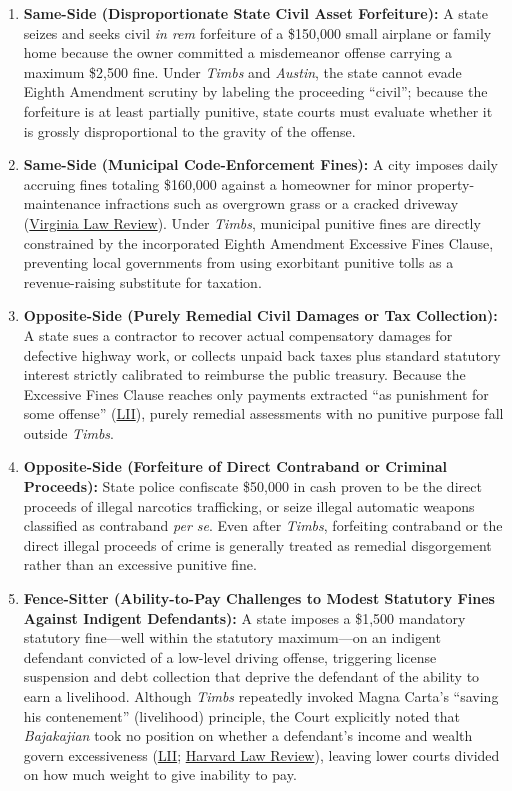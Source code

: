 \documentclass[12pt]{article}
\begin{document}
\begin{enumerate}
  \item \textbf{Same-Side (Disproportionate State Civil Asset Forfeiture):} A state seizes and seeks civil \textit{in rem} forfeiture of a \$150,000 small airplane or family home because the owner committed a misdemeanor offense carrying a maximum \$2,500 fine. Under \textit{Timbs} and \textit{Austin}, the state cannot evade Eighth Amendment scrutiny by labeling the proceeding ``civil''; because the forfeiture is at least partially punitive, state courts must evaluate whether it is grossly disproportional to the gravity of the offense.
  \item \textbf{Same-Side (Municipal Code-Enforcement Fines):} A city imposes daily accruing fines totaling \$160,000 against a homeowner for minor property-maintenance infractions such as overgrown grass or a cracked driveway (\href{https://virginialawreview.org/wp-content/uploads/2025/03/Asbridge_Revised.pdf}{Virginia Law Review}). Under \textit{Timbs}, municipal punitive fines are directly constrained by the incorporated Eighth Amendment Excessive Fines Clause, preventing local governments from using exorbitant punitive tolls as a revenue-raising substitute for taxation.
  \item \textbf{Opposite-Side (Purely Remedial Civil Damages or Tax Collection):} A state sues a contractor to recover actual compensatory damages for defective highway work, or collects unpaid back taxes plus standard statutory interest strictly calibrated to reimburse the public treasury. Because the Excessive Fines Clause reaches only payments extracted ``as punishment for some offense'' (\href{https://www.law.cornell.edu/supremecourt/text/17-1091}{LII}), purely remedial assessments with no punitive purpose fall outside \textit{Timbs}.
  \item \textbf{Opposite-Side (Forfeiture of Direct Contraband or Criminal Proceeds):} State police confiscate \$50,000 in cash proven to be the direct proceeds of illegal narcotics trafficking, or seize illegal automatic weapons classified as contraband \textit{per se}. Even after \textit{Timbs}, forfeiting contraband or the direct illegal proceeds of crime is generally treated as remedial disgorgement rather than an excessive punitive fine.
  \item \textbf{Fence-Sitter (Ability-to-Pay Challenges to Modest Statutory Fines Against Indigent Defendants):} A state imposes a \$1,500 mandatory statutory fine---well within the statutory maximum---on an indigent defendant convicted of a low-level driving offense, triggering license suspension and debt collection that deprive the defendant of the ability to earn a livelihood. Although \textit{Timbs} repeatedly invoked Magna Carta's ``saving his contenement'' (livelihood) principle, the Court explicitly noted that \textit{Bajakajian} took no position on whether a defendant's income and wealth govern excessiveness (\href{https://www.law.cornell.edu/supremecourt/text/17-1091}{LII}; \href{https://harvardlawreview.org/print/vol-133/timbs-v-indiana/}{Harvard Law Review}), leaving lower courts divided on how much weight to give inability to pay.
\end{enumerate}
\end{document}
